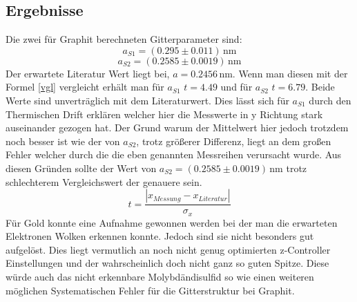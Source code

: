 \subsection{Ergebnisse}
Die zwei für Graphit berechneten Gitterparameter sind:
\begin{equation*}
a_{S1}=(0.295\pm 0.011)\,\text{nm}
\end{equation*}
\begin{equation*}
a_{S2}=(0.2585\pm0.0019)\,\text{nm}
\end{equation*}
Der erwartete Literatur Wert liegt bei, $a=0.2456\,$nm. Wenn man diesen mit der Formel \ref{vgl} vergleicht erhält man für $a_{S1}$ $t=4.49$ und für $a_{S2}$ $t=6.79$.
Beide Werte sind unverträglich mit dem Literaturwert. Dies lässt sich für $a_{S1}$ durch den Thermischen Drift erklären welcher hier die Messwerte in y Richtung stark auseinander gezogen hat. Der Grund warum der Mittelwert hier jedoch trotzdem noch besser ist wie der von $a_{S2}$, trotz größerer Differenz, liegt an dem großen Fehler welcher durch die die eben genannten Messreihen verursacht wurde. Aus diesen Gründen sollte der Wert von $a_{S2}=(0.2585\pm0.0019)\,\text{nm}$ trotz schlechterem Vergleichswert der genauere sein.
\begin{equation}
	t=\frac{|x_{Messung}-x_{Literatur}|}{\sigma_{x}}
	\label{vgl}
\end{equation}
Für Gold konnte eine Aufnahme gewonnen werden bei der man die erwarteten Elektronen Wolken erkennen konnte. Jedoch sind sie nicht besonders gut aufgelöst. Dies liegt vermutlich an noch nicht genug optimierten z-Controller Einstellungen und der wahrscheinlich doch nicht ganz so guten Spitze. Diese würde auch das nicht erkennbare Molybdändisulfid so wie einen weiteren möglichen Systematischen Fehler für die Gitterstruktur bei Graphit.